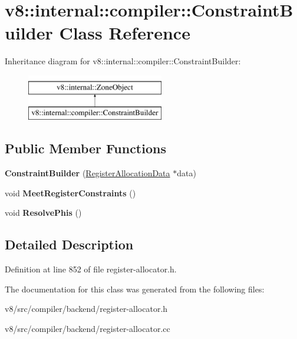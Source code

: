 \hypertarget{classv8_1_1internal_1_1compiler_1_1ConstraintBuilder}{}\section{v8\+:\+:internal\+:\+:compiler\+:\+:Constraint\+Builder Class Reference}
\label{classv8_1_1internal_1_1compiler_1_1ConstraintBuilder}
Inheritance diagram for v8\+:\+:internal\+:\+:compiler\+:\+:Constraint\+Builder\+:\begin{figure}[H]
\begin{center}
\leavevmode
\includegraphics[height=2.000000cm]{classv8_1_1internal_1_1compiler_1_1ConstraintBuilder}
\end{center}
\end{figure}
\subsection*{Public Member Functions}
\begin{DoxyCompactItemize}
\item 
\mbox{\label{classv8_1_1internal_1_1compiler_1_1ConstraintBuilder_aa89f59cdb50c8029bd8b14c9ef93cf0b}} 
{\bfseries Constraint\+Builder} (\mbox{\hyperlink{classv8_1_1internal_1_1compiler_1_1RegisterAllocationData}{Register\+Allocation\+Data}} $\ast$data)
\item 
\mbox{\label{classv8_1_1internal_1_1compiler_1_1ConstraintBuilder_a07a572b8f42f29934d5732f326c301a5}} 
void {\bfseries Meet\+Register\+Constraints} ()
\item 
\mbox{\label{classv8_1_1internal_1_1compiler_1_1ConstraintBuilder_a7c8bc9fb22690f82441724350c9088cc}} 
void {\bfseries Resolve\+Phis} ()
\end{DoxyCompactItemize}


\subsection{Detailed Description}


Definition at line 852 of file register-\/allocator.\+h.



The documentation for this class was generated from the following files\+:\begin{DoxyCompactItemize}
\item 
v8/src/compiler/backend/register-\/allocator.\+h\item 
v8/src/compiler/backend/register-\/allocator.\+cc\end{DoxyCompactItemize}
